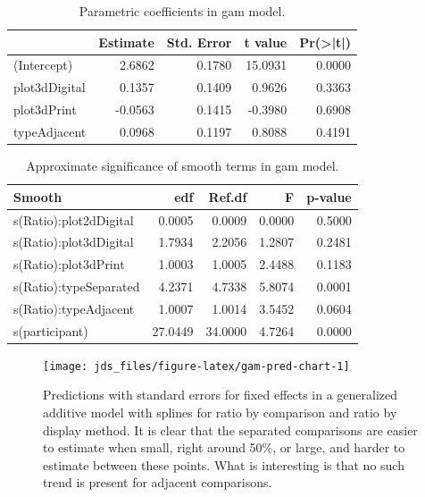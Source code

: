 \documentclass[letterpaper,inpress,dvipsnames]{jdsart}
\begin{document}
\begin{table}

\caption{\label{tab:gam-param}Parametric coefficients in gam model.}
\centering
\begin{tabular}[t]{lrrrr}
\toprule
  & Estimate & Std. Error & t value & Pr(>|t|)\\
\midrule
(Intercept) & 2.6862 & 0.1780 & 15.0931 & 0.0000\\
plot3dDigital & 0.1357 & 0.1409 & 0.9626 & 0.3363\\
plot3dPrint & -0.0563 & 0.1415 & -0.3980 & 0.6908\\
typeAdjacent & 0.0968 & 0.1197 & 0.8088 & 0.4191\\
\bottomrule
\end{tabular}
\end{table}

\begin{table}

\caption{\label{tab:gam-smooth}Approximate significance of smooth terms in gam model.}
\centering
\begin{tabular}[t]{lrrrr}
\toprule
Smooth & edf & Ref.df & F & p-value\\
\midrule
s(Ratio):plot2dDigital & 0.0005 & 0.0009 & 0.0000 & 0.5000\\
s(Ratio):plot3dDigital & 1.7934 & 2.2056 & 1.2807 & 0.2481\\
s(Ratio):plot3dPrint & 1.0003 & 1.0005 & 2.4488 & 0.1183\\
s(Ratio):typeSeparated & 4.2371 & 4.7338 & 5.8074 & 0.0001\\
s(Ratio):typeAdjacent & 1.0007 & 1.0014 & 3.5452 & 0.0604\\
\addlinespace
s(participant) & 27.0449 & 34.0000 & 4.7264 & 0.0000\\
\bottomrule
\end{tabular}
\end{table}

\begin{figure}
\texttt{[image: jds\_files/figure-latex/gam-pred-chart-1]} \caption{Predictions with standard errors for fixed effects in a generalized additive model with splines for ratio by comparison and ratio by display method. It is clear that the separated comparisons are easier to estimate when small, right around 50\%, or large, and harder to estimate between these points. What is interesting is that no such trend is present for adjacent comparisons. }\label{fig:gam-pred-chart}
\end{figure}
\end{document}
